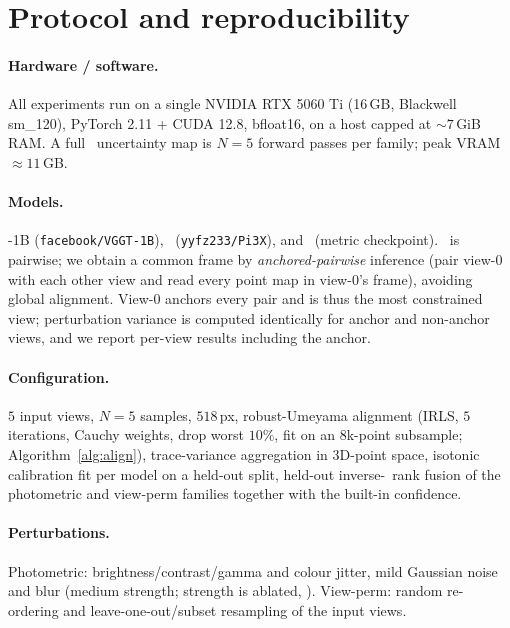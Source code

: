 \section{Protocol and reproducibility}
\label{app:repro}

\paragraph{Hardware / software.} All experiments run on a single NVIDIA RTX 5060 Ti (16\,GB,
Blackwell sm\_120), PyTorch 2.11 + CUDA 12.8, bfloat16, on a host capped at ${\sim}7$\,GiB RAM. A full
\trustr\ uncertainty map is $N{=}5$ forward passes per family; peak VRAM $\approx 11$\,GB.

\paragraph{Models.} \vggt-1B (\texttt{facebook/VGGT-1B}), \pii\ (\texttt{yyfz233/Pi3X}), and \mastr\
(metric checkpoint). \mastr\ is pairwise; we obtain a common frame by \emph{anchored-pairwise}
inference (pair view-0 with each other view and read every point map in view-0's frame), avoiding
global alignment. View-0 anchors every pair and is thus the most constrained view; perturbation
variance is computed identically for anchor and non-anchor views, and we report per-view results
including the anchor.

\paragraph{Configuration.} $5$ input views, $N{=}5$ samples, $518$\,px, robust-Umeyama alignment
(IRLS, $5$ iterations, Cauchy weights, drop worst $10\%$, fit on an $8$k-point subsample;
Algorithm~\ref{alg:align}), trace-variance aggregation in 3D-point space, isotonic calibration fit per
model on a held-out split, held-out inverse-\ause\ rank fusion of the photometric and view-perm
families together with the built-in confidence.

\paragraph{Perturbations.} Photometric: brightness/contrast/gamma and colour jitter, mild Gaussian
noise and blur (medium strength; strength is ablated, \Cref{sec:abl-rest}). View-perm: random
re-ordering and leave-one-out/subset resampling of the input views.

